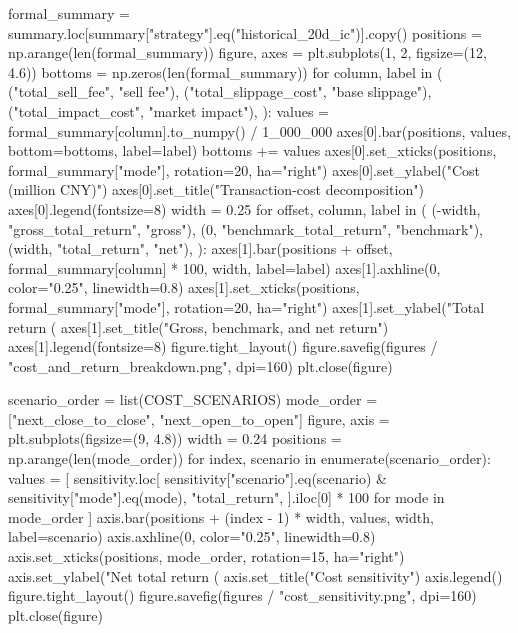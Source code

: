 \documentclass[UTF8,a4paper,fontset=fandol]{ctexart}
\begin{document}
\begin{ProjectCode}
    formal_summary = summary.loc[summary["strategy"].eq("historical_20d_ic")].copy()
    positions = np.arange(len(formal_summary))
    figure, axes = plt.subplots(1, 2, figsize=(12, 4.6))
    bottoms = np.zeros(len(formal_summary))
    for column, label in (
        ("total_sell_fee", "sell fee"),
        ("total_slippage_cost", "base slippage"),
        ("total_impact_cost", "market impact"),
    ):
        values = formal_summary[column].to_numpy() / 1_000_000
        axes[0].bar(positions, values, bottom=bottoms, label=label)
        bottoms += values
    axes[0].set_xticks(positions, formal_summary["mode"], rotation=20, ha="right")
    axes[0].set_ylabel("Cost (million CNY)")
    axes[0].set_title("Transaction-cost decomposition")
    axes[0].legend(fontsize=8)
    width = 0.25
    for offset, column, label in (
        (-width, "gross_total_return", "gross"),
        (0, "benchmark_total_return", "benchmark"),
        (width, "total_return", "net"),
    ):
        axes[1].bar(positions + offset, formal_summary[column] * 100, width, label=label)
    axes[1].axhline(0, color="0.25", linewidth=0.8)
    axes[1].set_xticks(positions, formal_summary["mode"], rotation=20, ha="right")
    axes[1].set_ylabel("Total return (%
    axes[1].set_title("Gross, benchmark, and net return")
    axes[1].legend(fontsize=8)
    figure.tight_layout()
    figure.savefig(figures / "cost_and_return_breakdown.png", dpi=160)
    plt.close(figure)

    scenario_order = list(COST_SCENARIOS)
    mode_order = ["next_close_to_close", "next_open_to_open"]
    figure, axis = plt.subplots(figsize=(9, 4.8))
    width = 0.24
    positions = np.arange(len(mode_order))
    for index, scenario in enumerate(scenario_order):
        values = [
            sensitivity.loc[
                sensitivity["scenario"].eq(scenario) & sensitivity["mode"].eq(mode),
                "total_return",
            ].iloc[0] * 100
            for mode in mode_order
        ]
        axis.bar(positions + (index - 1) * width, values, width, label=scenario)
    axis.axhline(0, color="0.25", linewidth=0.8)
    axis.set_xticks(positions, mode_order, rotation=15, ha="right")
    axis.set_ylabel("Net total return (%
    axis.set_title("Cost sensitivity")
    axis.legend()
    figure.tight_layout()
    figure.savefig(figures / "cost_sensitivity.png", dpi=160)
    plt.close(figure)


\end{ProjectCode}
\end{document}
